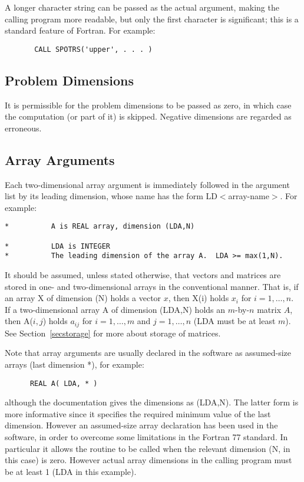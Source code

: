 A longer
character string can be passed as the actual argument, making the calling
program more readable, but only the first character is significant;
this is a standard feature of Fortran.
For example:

\begin{verbatim}
       CALL SPOTRS('upper', . . . )
\end{verbatim}

\subsection{Problem Dimensions}\label{subsecdims}

It is permissible for the problem dimensions 
to be passed as zero, in
which case the computation (or part of it) is skipped. 
Negative dimensions are regarded as erroneous.

\subsection{Array Arguments}\label{subsecarrayargs}

Each two-dimensional array argument is 
immediately followed in the
argument list by its leading dimension, whose 
name has the form LD$<$array-name$>$. For example:

\begin{verbatim}
*          A is REAL array, dimension (LDA,N)

*          LDA is INTEGER
*          The leading dimension of the array A.  LDA >= max(1,N).
\end{verbatim}

It should be assumed, unless stated otherwise, that vectors and
matrices are stored in one- and two-dimensional arrays in the
conventional manner. That is, if an array X of dimension (N) holds
a vector $x$, then X(i) holds $x_{i}$ for $i = 1, \ldots, n$.
If a two-dimensional array A of dimension (LDA,N) holds an $m$-by-$n$
matrix $A$, 
then A($i,j$) holds $a_{ij}$ for $i = 1, \ldots, m$ and
$j = 1, \ldots, n$ (LDA must be at least $m$). 
See Section~\ref{secstorage} for more about
storage of matrices.

Note that
array arguments are usually declared in the software as assumed-size arrays 
(last dimension *), for example:
\begin{verbatim}
      REAL A( LDA, * )
\end{verbatim}
although the documentation gives the dimensions as (LDA,N). The latter
form is more informative since it specifies the required minimum value of 
the last dimension. However
an assumed-size array declaration has been used in the software,
in order to overcome some
limitations in the Fortran 77 standard. In particular it allows the
routine to be called when the relevant dimension (N, in this case) is zero.
However actual array dimensions in the calling program must be at
least 1 (LDA in this example).

